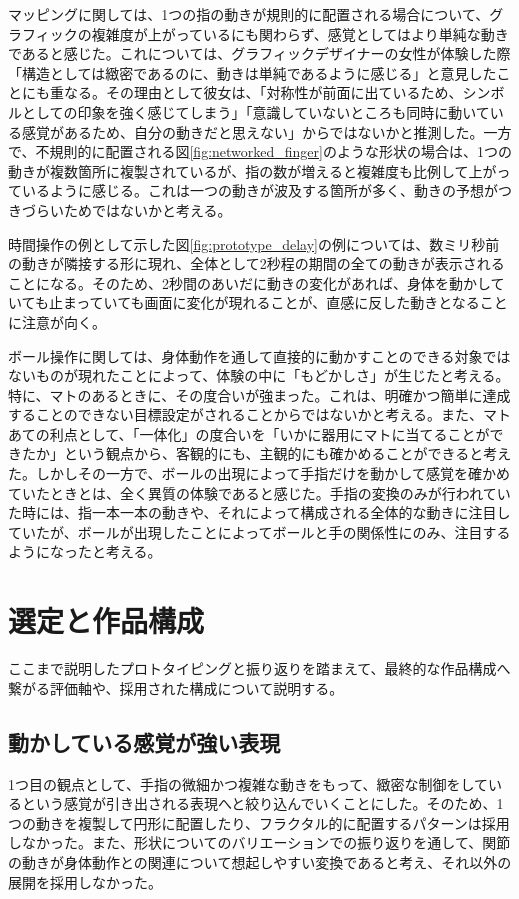マッピングに関しては、1つの指の動きが規則的に配置される場合について、グラフィックの複雑度が上がっているにも関わらず、感覚としてはより単純な動きであると感じた。これについては、グラフィックデザイナーの女性が体験した際「構造としては緻密であるのに、動きは単純であるように感じる」と意見したことにも重なる。その理由として彼女は、「対称性が前面に出ているため、シンボルとしての印象を強く感じてしまう」「意識していないところも同時に動いている感覚があるため、自分の動きだと思えない」からではないかと推測した。一方で、不規則的に配置される図\ref{fig:networked_finger}のような形状の場合は、1つの動きが複数箇所に複製されているが、指の数が増えると複雑度も比例して上がっているように感じる。これは一つの動きが波及する箇所が多く、動きの予想がつきづらいためではないかと考える。

時間操作の例として示した図\ref{fig:prototype_delay}の例については、数ミリ秒前の動きが隣接する形に現れ、全体として2秒程の期間の全ての動きが表示されることになる。そのため、2秒間のあいだに動きの変化があれば、身体を動かしていても止まっていても画面に変化が現れることが、直感に反した動きとなることに注意が向く。

ボール操作に関しては、身体動作を通して直接的に動かすことのできる対象ではないものが現れたことによって、体験の中に「もどかしさ」が生じたと考える。特に、マトのあるときに、その度合いが強まった。これは、明確かつ簡単に達成することのできない目標設定がされることからではないかと考える。また、マトあての利点として、「一体化」の度合いを「いかに器用にマトに当てることができたか」という観点から、客観的にも、主観的にも確かめることができると考えた。しかしその一方で、ボールの出現によって手指だけを動かして感覚を確かめていたときとは、全く異質の体験であると感じた。手指の変換のみが行われていた時には、指一本一本の動きや、それによって構成される全体的な動きに注目していたが、ボールが出現したことによってボールと手の関係性にのみ、注目するようになったと考える。

\section{選定と作品構成}
ここまで説明したプロトタイピングと振り返りを踏まえて、最終的な作品構成へ繋がる評価軸や、採用された構成について説明する。
\subsection{動かしている感覚が強い表現}
1つ目の観点として、手指の微細かつ複雑な動きをもって、緻密な制御をしているという感覚が引き出される表現へと絞り込んでいくことにした。そのため、1つの動きを複製して円形に配置したり、フラクタル的に配置するパターンは採用しなかった。また、形状についてのバリエーションでの振り返りを通して、関節の動きが身体動作との関連について想起しやすい変換であると考え、それ以外の展開を採用しなかった。

